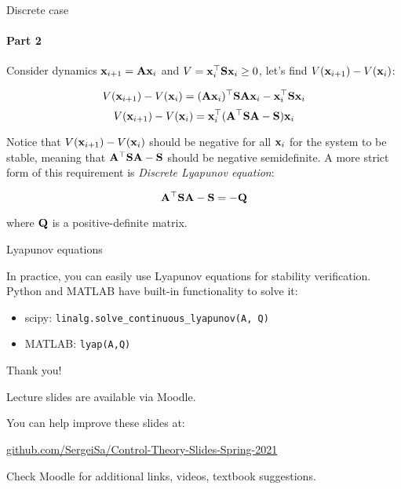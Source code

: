 \documentclass{beamer}
\begin{document}
\begin{frame}{Discrete case}
\framesubtitle{Part 2}
\begin{flushleft}

Consider dynamics $\mathbf{x}_{i+1} = \mathbf{A}\mathbf{x}_i$ and $V = \mathbf{x}_i^\top\mathbf{S}\mathbf{x}_i \geq 0$, let's find $V(\mathbf{x}_{i+1}) - V(\mathbf{x}_i)$:

\begin{equation}
    V(\mathbf{x}_{i+1}) - V(\mathbf{x}_i) = (\mathbf{A}\mathbf{x}_i)^\top\mathbf{S}\mathbf{A}\mathbf{x}_i - 
    \mathbf{x}_i^\top\mathbf{S}\mathbf{x}_i
\end{equation}
\begin{equation}
    V(\mathbf{x}_{i+1}) - V(\mathbf{x}_i) = \mathbf{x}_i^\top(\mathbf{A}^\top\mathbf{S}\mathbf{A} - \mathbf{S})\mathbf{x}_i
\end{equation}

Notice that $V(\mathbf{x}_{i+1}) - V(\mathbf{x}_i)$ should be negative for all $\mathbf{x}_i$ for the system to be stable, meaning that $\mathbf{A}^\top\mathbf{S}\mathbf{A} - \mathbf{S}$ should be negative semidefinite. A more strict form of this requirement is \emph{Discrete Lyapunov equation}:

\begin{equation}
    \mathbf{A}^\top\mathbf{S}\mathbf{A} - \mathbf{S} = -\mathbf{Q}
\end{equation}

where $\mathbf{Q}$ is a positive-definite matrix.

\end{flushleft}
\end{frame}






\begin{frame}{Lyapunov equations}
\begin{flushleft}

In practice, you can easily use Lyapunov equations for stability verification. Python and MATLAB have built-in functionality to solve it:

\begin{itemize}
    \item scipy: \texttt{linalg.solve\_continuous\_lyapunov(A, Q)}
    \item MATLAB: \texttt{lyap(A,Q)}
\end{itemize}

\end{flushleft}
\end{frame}




\begin{frame}{Thank you!}
\centerline{Lecture slides are available via Moodle.}
\bigskip
\centerline{You can help improve these slides at:}
\centerline{\href{https://github.com/SergeiSa/Control-Theory-Slides-Spring-2021}{github.com/SergeiSa/Control-Theory-Slides-Spring-2021}}
\bigskip
\centerline{Check Moodle for additional links, videos, textbook suggestions.}
\end{frame}
\end{document}
